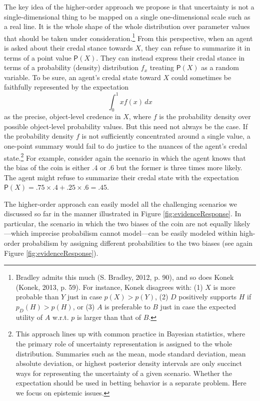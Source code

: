 \documentclass[
  10pt,
  dvipsnames,enabledeprecatedfontcommands]{scrartcl}
\begin{document}
The key idea of the higher-order approach we propose is that uncertainty
is not a single-dimensional thing to be mapped on a single
one-dimensional scale such as a real line. It is the whole shape of the
whole distribution over parameter values that should be taken under
consideration.\footnote{Bradley admits this much (S. Bradley, 2012, p.
  90), and so does Konek (Konek, 2013, p. 59). For instance, Konek
  disagrees with: (1) \(X\) is more probable than \(Y\) just in case
  \(p(X)>p(Y)\), (2) \(D\) positively supports \(H\) if
  \(p_D(H)> p(H)\), or (3) \(A\) is preferable to \(B\) just in case the
  expected utility of \(A\) w.r.t. \(p\) is larger than that of \(B\).}
From this perspective, when an agent is asked about their credal stance
towards \(X\), they can refuse to summarize it in terms of a point value
\(\mathsf{P}(X)\). They can instead express their credal stance in terms
of a probability (density) distribution \(f_x\) treating
\(\mathsf{P}(X)\) as a random variable. To be sure, an agent's credal
state toward \(X\) could sometimes be faithfully represented by the
expectation\\
\[\int_{0}^{1} x f(x) \, dx\] as the precise, object-level credence in
\(X\), where \(f\) is the probability density over possible object-level
probability values. But this need not always be the case. If the
probability density \(f\) is not sufficiently concentrated around a
single value, a one-point summary would fail to do justice to the
nuances of the agent's credal state.\footnote{This approach lines up
  with common practice in Bayesian statistics, where the primary role of
  uncertainty representation is assigned to the whole distribution.
  Summaries such as the mean, mode standard deviation, mean absolute
  deviation, or highest posterior density intervals are only succinct
  ways for representing the uncertainty of a given scenario. Whether the
  expectation should be used in betting behavior is a separate problem.
  Here we focus on epistemic issues.} For example, consider again the
scenario in which the agent knows that the bias of the coin is either .4
or .6 but the former is three times more likely. The agent might refuse
to summarize their credal state with the expectation
\(\mathsf{P}(X) = .75 \times .4 + .25 \times .6 = .45\).

The higher-order approach can easily model all the challenging scenarios
we discussed so far in the manner illustrated in Figure
\ref{fig:evidenceResponse}. In particular, the scenario in which the two
biases of the coin are not equally likely---which imprecise probabilism
cannot model---can be easily modeled within high-order probabilism by
assigning different probabilities to the two biases (see again Figure
\ref{fig:evidenceResponse}).
\end{document}
